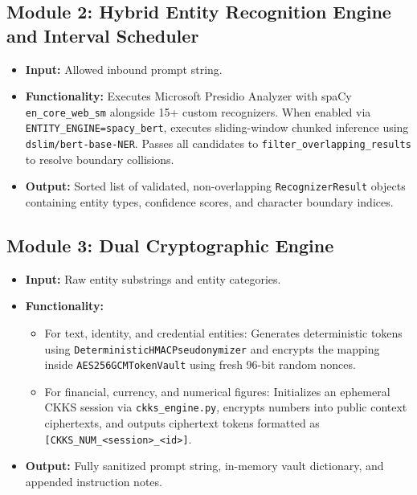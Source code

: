 \subsection{Module 2: Hybrid Entity Recognition Engine and Interval Scheduler}
\begin{itemize}[leftmargin=*]
    \item \textbf{Input:} Allowed inbound prompt string.
    \item \textbf{Functionality:} Executes Microsoft Presidio Analyzer with spaCy \texttt{en\_core\_web\_sm} alongside 15+ custom recognizers. When enabled via \texttt{ENTITY\_ENGINE=spacy\_bert}, executes sliding-window chunked inference using \texttt{dslim/bert-base-NER}. Passes all candidates to \texttt{filter\_overlapping\_results} to resolve boundary collisions.
    \item \textbf{Output:} Sorted list of validated, non-overlapping \texttt{RecognizerResult} objects containing entity types, confidence scores, and character boundary indices.
\end{itemize}

\subsection{Module 3: Dual Cryptographic Engine}
\begin{itemize}[leftmargin=*]
    \item \textbf{Input:} Raw entity substrings and entity categories.
    \item \textbf{Functionality:} 
    \begin{itemize}
        \item For text, identity, and credential entities: Generates deterministic tokens using \texttt{DeterministicHMACPseudonymizer} and encrypts the mapping inside \texttt{AES256GCMTokenVault} using fresh 96-bit random nonces.
        \item For financial, currency, and numerical figures: Initializes an ephemeral CKKS session via \texttt{ckks\_engine.py}, encrypts numbers into public context ciphertexts, and outputs ciphertext tokens formatted as \texttt{[CKKS\_NUM\_<session>\_<id>]}.
    \end{itemize}
    \item \textbf{Output:} Fully sanitized prompt string, in-memory vault dictionary, and appended instruction notes.
\end{itemize}

